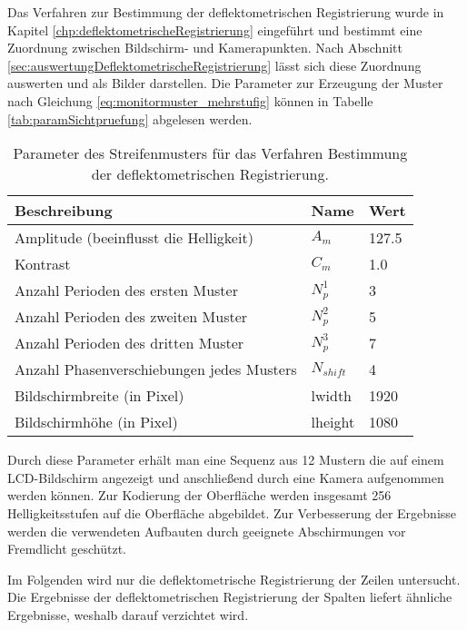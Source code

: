 Das Verfahren zur Bestimmung der deflektometrischen Registrierung wurde in Kapitel \ref{chp:deflektometrischeRegistrierung} eingeführt und bestimmt eine Zuordnung zwischen Bildschirm- und Kamerapunkten.
Nach Abschnitt \ref{sec:auswertungDeflektometrischeRegistrierung} lässt sich diese Zuordnung auswerten und als Bilder darstellen.
Die Parameter zur Erzeugung der Muster nach Gleichung \ref{eq:monitormuster_mehrstufig} können in Tabelle \ref{tab:paramSichtpruefung} abgelesen werden.

\begin{table}[H]
	\centering
	\begin{tabular}{lll}
	\hline 
	\textbf{Beschreibung} & \textbf{Name} & \textbf{Wert} \\ 
	\hline 
	Amplitude (beeinflusst die Helligkeit) & $A_m$ & 127.5 \\
	Kontrast & $C_m$ & 1.0 \\
	Anzahl Perioden des ersten Muster & $N_p^1$ & 3 \\ 
	Anzahl Perioden des zweiten Muster & $N_p^2$ & 5 \\ 
	Anzahl Perioden des dritten Muster & $N_p^3$ & 7 \\  
	Anzahl Phasenverschiebungen jedes Musters & $N_{shift}$ & 4 \\ 
	Bildschirmbreite (in Pixel) & \acrshort{lwidth} & 1920 \\
	Bildschirmhöhe (in Pixel) & \acrshort{lheight} & 1080 \\
	\hline 
	\end{tabular} 
	\caption{Parameter des Streifenmusters für das Verfahren \glqq Bestimmung der deflektometrischen Registrierung\grqq.}
	\label{tab:paramDeflektometrischRegistrierung}
\end{table}

\noindent
Durch diese Parameter erhält man eine Sequenz aus 12 Mustern die auf einem LCD-Bildschirm angezeigt und anschließend durch eine Kamera aufgenommen werden können.
Zur Kodierung der Oberfläche werden insgesamt 256 Helligkeitsstufen auf die Oberfläche abgebildet.
Zur Verbesserung der Ergebnisse werden die verwendeten Aufbauten durch geeignete Abschirmungen vor Fremdlicht geschützt.

\p
Im Folgenden wird nur die deflektometrische Registrierung der Zeilen untersucht.
Die Ergebnisse der deflektometrischen Registrierung der Spalten liefert ähnliche Ergebnisse, weshalb darauf verzichtet wird.

